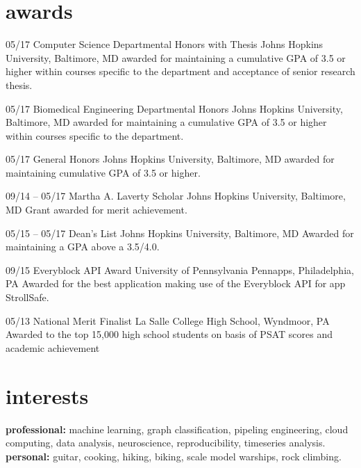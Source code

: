 \documentclass[]{friggeri-cv} %
\begin{document}
\newpage

\section{awards}

\begin{entrylist}
\entry
{05/17}
{Computer Science Departmental Honors with Thesis}
{Johns Hopkins University, Baltimore, MD}
{awarded for maintaining a cumulative GPA of 3.5 or higher within courses specific to the department and acceptance of senior research thesis.}

\entry
{05/17}
{Biomedical Engineering Departmental Honors}
{Johns Hopkins University, Baltimore, MD}
{awarded for maintaining a cumulative GPA of 3.5 or higher within courses specific to the department.}

\entry
{05/17}
{General Honors}
{Johns Hopkins University, Baltimore, MD}
{awarded for maintaining cumulative GPA of 3.5 or higher.}

\entry
{09/14 -- 05/17}
{Martha A. Laverty Scholar}
{Johns Hopkins University, Baltimore, MD}
{Grant awarded for merit achievement.}

\entry
{05/15 -- 05/17}
{Dean's List}
{Johns Hopkins University, Baltimore, MD}
{Awarded for maintaining a GPA above a 3.5/4.0.}

\entry
{09/15}
{Everyblock API Award}
{University of Pennsylvania Pennapps, Philadelphia, PA}
{Awarded for the best application making use of the Everyblock API for app StrollSafe.}

\entry
{05/13}
{National Merit Finalist}
{La Salle College High School, Wyndmoor, PA}
{Awarded to the top 15,000 high school students on basis of PSAT scores and academic achievement}

\end{entrylist}


\section{interests}

\textbf{professional:} machine learning, graph classification, pipeling engineering, cloud computing, data analysis, neuroscience, reproducibility, timeseries analysis.\\
\textbf{personal:} guitar, cooking, hiking, biking, scale model warships, rock climbing.
\end{document}
